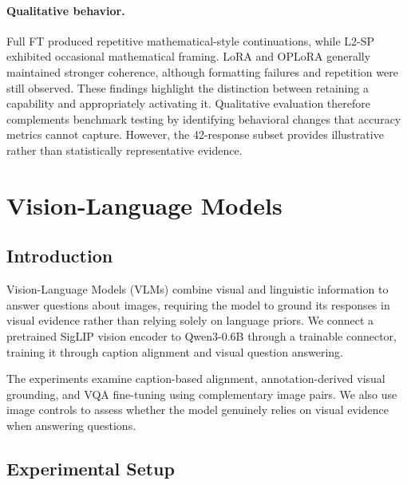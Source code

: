 \documentclass{article}
\begin{document}
\paragraph{Qualitative behavior.}
Full FT produced repetitive mathematical-style continuations, while L2-SP exhibited occasional mathematical framing. LoRA and OPLoRA generally maintained stronger coherence, although formatting failures and repetition were still observed. These findings highlight the distinction between retaining a capability and appropriately activating it. Qualitative evaluation therefore complements benchmark testing by identifying behavioral changes that accuracy metrics cannot capture. However, the 42-response subset provides illustrative rather than statistically representative evidence.

\section{Vision-Language Models}
\label{sec:vlm}

\subsection{Introduction}
\label{sec:vlm-intro}

Vision-Language Models (VLMs) combine visual and linguistic information to answer questions about images, requiring the model to ground its responses in visual evidence rather than relying solely on language priors. We connect a pretrained SigLIP vision encoder to Qwen3-0.6B through a trainable connector, training it through caption alignment and visual question answering.

The experiments examine caption-based alignment, annotation-derived visual grounding, and VQA fine-tuning using complementary image pairs. We also use image controls to assess whether the model genuinely relies on visual evidence when answering questions.

\subsection{Experimental Setup}
\label{sec:vlm-setup}
\end{document}
